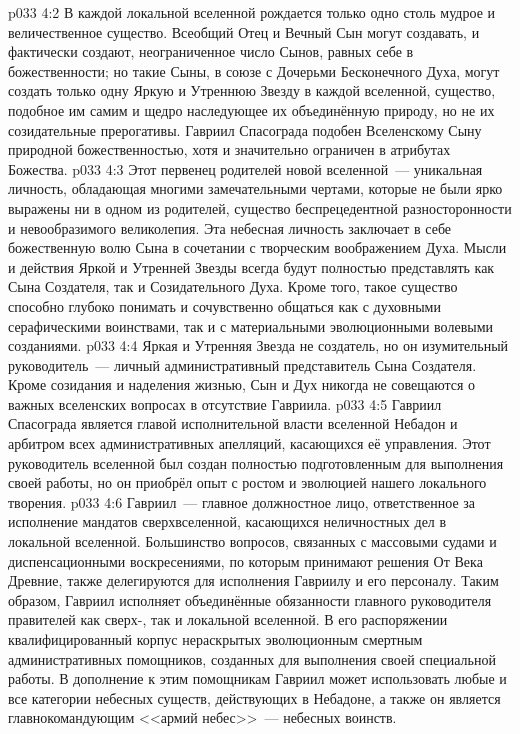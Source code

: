\vs p033 4:2 В каждой локальной вселенной рождается только одно столь мудрое и величественное существо. Всеобщий Отец и Вечный Сын могут создавать, и фактически создают, неограниченное число Сынов, равных себе в божественности; но такие Сыны, в союзе с Дочерьми Бесконечного Духа, могут создать только одну Яркую и Утреннюю Звезду в каждой вселенной, существо, подобное им самим и щедро наследующее их объединённую природу, но не их созидательные прерогативы. Гавриил Спасограда подобен Вселенскому Сыну природной божественностью, хотя и значительно ограничен в атрибутах Божества.
\vs p033 4:3 Этот первенец родителей новой вселенной~--- уникальная личность, обладающая многими замечательными чертами, которые не были ярко выражены ни в одном из родителей, существо беспрецедентной разносторонности и невообразимого великолепия. Эта небесная личность заключает в себе божественную волю Сына в сочетании с творческим воображением Духа. Мысли и действия Яркой и Утренней Звезды всегда будут полностью представлять как Сына Создателя, так и Созидательного Духа. Кроме того, такое существо способно глубоко понимать и сочувственно общаться как с духовными серафическими воинствами, так и с материальными эволюционными волевыми созданиями.
\vs p033 4:4 \pc Яркая и Утренняя Звезда не создатель, но он изумительный руководитель~--- личный административный представитель Сына Создателя. Кроме созидания и наделения жизнью, Сын и Дух никогда не совещаются о важных вселенских вопросах в отсутствие Гавриила.
\vs p033 4:5 Гавриил Спасограда является главой исполнительной власти вселенной Небадон и арбитром всех административных апелляций, касающихся её управления. Этот руководитель вселенной был создан полностью подготовленным для выполнения своей работы, но он приобрёл опыт с ростом и эволюцией нашего локального творения.
\vs p033 4:6 Гавриил~--- главное должностное лицо, ответственное за исполнение мандатов сверхвселенной, касающихся неличностных дел в локальной вселенной. Большинство вопросов, связанных с массовыми судами и диспенсационными воскресениями, по которым принимают решения От Века Древние, также делегируются для исполнения Гавриилу и его персоналу. Таким образом, Гавриил исполняет объединённые обязанности главного руководителя правителей как сверх-, так и локальной вселенной. В его распоряжении квалифицированный корпус нераскрытых эволюционным смертным административных помощников, созданных для выполнения своей специальной работы. В дополнение к этим помощникам Гавриил может использовать любые и все категории небесных существ, действующих в Небадоне, а также он является главнокомандующим <<армий небес>>~--- небесных воинств.
